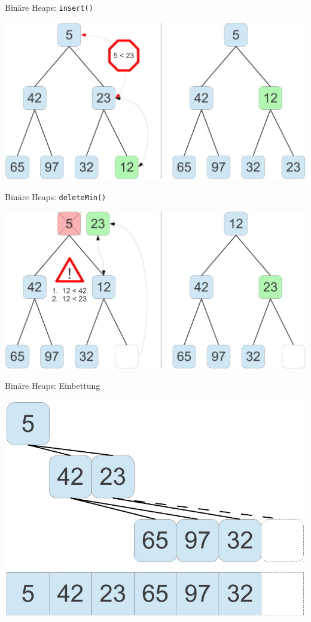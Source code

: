 \begin{frame}{Binäre Heaps: \texttt{insert()}}
	\begin{center}
		\includegraphics[width=0.90\linewidth]{images/heap_insert.pdf}
	\end{center}
\end{frame}

\begin{frame}{Binäre Heaps: \texttt{deleteMin()}}
	\begin{center}
		\includegraphics[width=0.90\linewidth]{images/heap_delete.pdf}
	\end{center}
\end{frame}

\begin{frame}{Binäre Heaps: Einbettung}
	\begin{center}
		\includegraphics[width=0.85\linewidth]{images/heap_embed.pdf}
	\end{center}
\end{frame}

